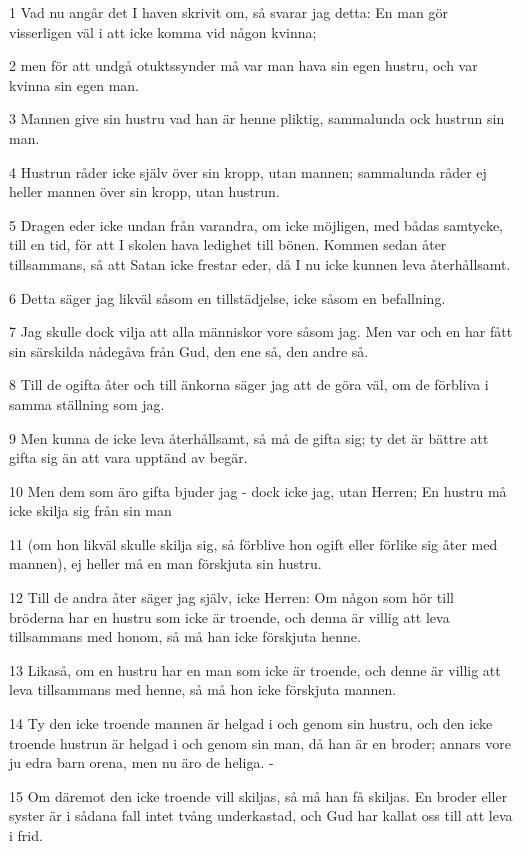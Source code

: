 \par 1 Vad nu angår det I haven skrivit om, så svarar jag detta: En man gör visserligen väl i att icke komma vid någon kvinna;
\par 2 men för att undgå otuktssynder må var man hava sin egen hustru, och var kvinna sin egen man.
\par 3 Mannen give sin hustru vad han är henne pliktig, sammalunda ock hustrun sin man.
\par 4 Hustrun råder icke själv över sin kropp, utan mannen; sammalunda råder ej heller mannen över sin kropp, utan hustrun.
\par 5 Dragen eder icke undan från varandra, om icke möjligen, med bådas samtycke, till en tid, för att I skolen hava ledighet till bönen. Kommen sedan åter tillsammans, så att Satan icke frestar eder, då I nu icke kunnen leva återhållsamt.
\par 6 Detta säger jag likväl såsom en tillstädjelse, icke såsom en befallning.
\par 7 Jag skulle dock vilja att alla människor vore såsom jag. Men var och en har fått sin särskilda nådegåva från Gud, den ene så, den andre så.
\par 8 Till de ogifta åter och till änkorna säger jag att de göra väl, om de förbliva i samma ställning som jag.
\par 9 Men kunna de icke leva återhållsamt, så må de gifta sig; ty det är bättre att gifta sig än att vara upptänd av begär.
\par 10 Men dem som äro gifta bjuder jag - dock icke jag, utan Herren; En hustru må icke skilja sig från sin man
\par 11 (om hon likväl skulle skilja sig, så förblive hon ogift eller förlike sig åter med mannen), ej heller må en man förskjuta sin hustru.
\par 12 Till de andra åter säger jag själv, icke Herren: Om någon som hör till bröderna har en hustru som icke är troende, och denna är villig att leva tillsammans med honom, så må han icke förskjuta henne.
\par 13 Likaså, om en hustru har en man som icke är troende, och denne är villig att leva tillsammans med henne, så må hon icke förskjuta mannen.
\par 14 Ty den icke troende mannen är helgad i och genom sin hustru, och den icke troende hustrun är helgad i och genom sin man, då han är en broder; annars vore ju edra barn orena, men nu äro de heliga. -
\par 15 Om däremot den icke troende vill skiljas, så må han få skiljas. En broder eller syster är i sådana fall intet tvång underkastad, och Gud har kallat oss till att leva i frid.
